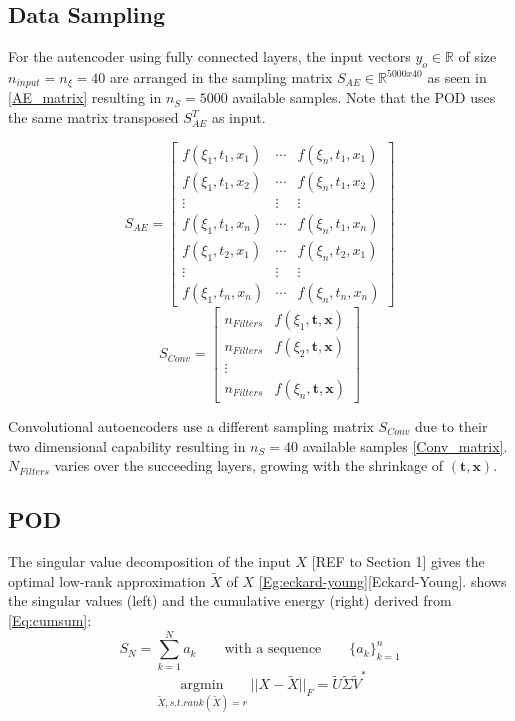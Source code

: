 \documentclass[12pt, a4paper]{article}
\begin{document}
\subsection{Data Sampling}
For the autencoder using fully connected layers, the input vectors $y_o \in \mathbb{R}$ of size $n_{input} = n_{\xi} = 40$ are arranged in the sampling matrix $S_{AE} \in \mathbb{R}^{5000x40}$ as seen in \cref{AE_matrix} resulting in $n_S = 5000$ available samples. Note that the POD uses the same matrix transposed $S_{AE}^T$ as input.
\begin{multicols}{2}
		\begin{equation}
		S_{AE} = \begin{bmatrix}
		f(\xi_1,t_1,x_1)&\cdots &f(\xi_n,t_1,x_1) \\
		f(\xi_1,t_1,x_2)&\cdots &f(\xi_n,t_1,x_2) \\
		\vdots& \vdots & \vdots\\
		f(\xi_1,t_1,x_n)&\cdots &f(\xi_n,t_1,x_n)\\
		f(\xi_1,t_2,x_1)&\cdots &f(\xi_n,t_2,x_1)\\
		\vdots & \vdots & \vdots\\
		f(\xi_1,t_n,x_n)&\cdots &f(\xi_n,t_n,x_n)
		\end{bmatrix}
		\label{AE_matrix}
		\end{equation}\break
		\begin{equation}
		S_{Conv}= \begin{bmatrix}
		n_{Filters}&f(\xi_1,\textbf{t},\textbf{x})\\
		n_{Filters}&f(\xi_2,\textbf{t},\textbf{x})\\
		\vdots\\
		n_{Filters}&f(\xi_n,\textbf{t},\textbf{x})
		\end{bmatrix}
		\label{Conv_matrix}
		\end{equation}
\end{multicols}\noindent
Convolutional autoencoders use a different sampling matrix $S_{Conv}$ due to their two dimensional capability resulting in $n_S = 40$ available samples \cref{Conv_matrix}.$N_{Filters}$ varies over the succeeding layers, growing with the shrinkage of $(\textbf{t},\textbf{x})$.
\subsection{POD}
The singular value decomposition of the input $X$ [REF to Section 1] gives the optimal low-rank approximation $\tilde{X}$ of $X$ \cref{Eg:eckard-young}[Eckard-Young].  shows the singular values (left) and the cumulative energy (right) derived from \cref{Eq:cumsum}:
\begin{equation}
S_N = \sum_{k=1}^{N}a_k \qquad\textrm{with a sequence} \qquad\{a_k\}_{k=1}^{n} 
\label{Eq:cumsum}
\end{equation}
\begin{equation}
\underset{\tilde{X}, s.t. rank(\tilde{X})=r}{\operatorname{argmin}} || X -\tilde{X} ||_F=\tilde{U}\tilde{\Sigma}\tilde{V}^*
\label{Eg:eckard-young}
\end{equation}
\end{document}
